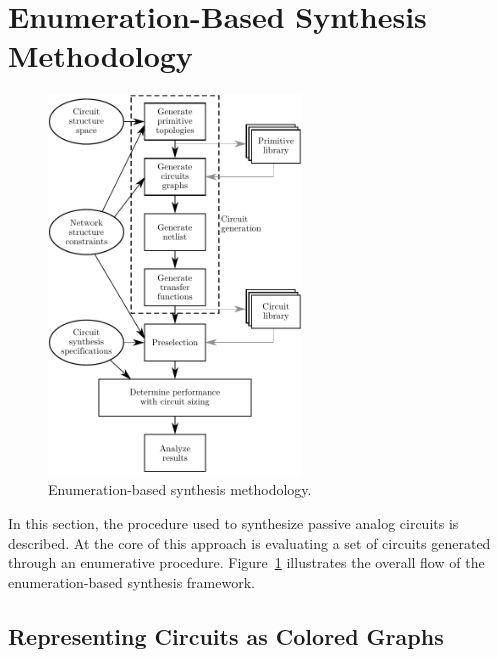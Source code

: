\section{Enumeration-Based Synthesis Methodology\label{sec:ch6:enumeration}}

\begin{figure}
\centering
\includegraphics[width=0.6\textwidth]{../ch6/figures/algorithm.pdf}
\caption{Enumeration-based synthesis methodology.\label{fig:ch6:algorithm}}
\end{figure}

In this section, the procedure used to synthesize passive analog circuits is described. 
At the core of this approach is evaluating a set of circuits generated through an enumerative procedure. 
Figure~\ref{fig:ch6:algorithm} illustrates the overall flow of the enumeration-based synthesis framework.

\subsection{Representing Circuits as Colored Graphs}


